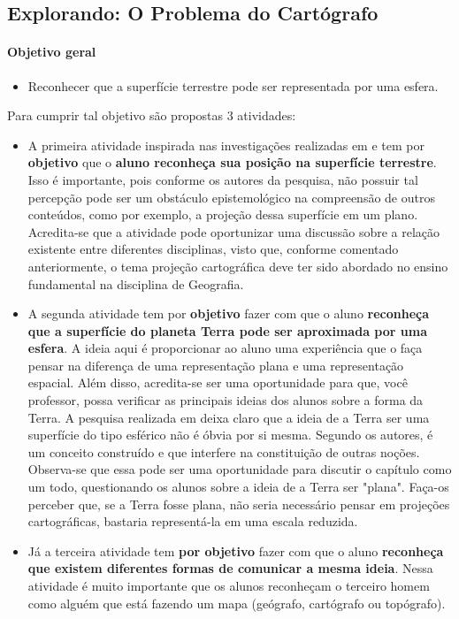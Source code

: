 \def\currentcolor{session1}
\begin{texto}
{
	\subsection{Explorando: O Problema do Cartógrafo}

	\paragraph{Objetivo geral}
	\begin{itemize}
	\item Reconhecer que a superfície terrestre pode ser representada por uma esfera.
	\end{itemize}

	Para cumprir tal objetivo são propostas 3 atividades:
	\begin{itemize}
	\item A primeira atividade inspirada nas investigações realizadas em \citep{Nussbaum} e \citep{Nardi}  tem por \textbf{objetivo} que o \textbf{aluno reconheça sua posição na superfície terrestre}. Isso é importante, pois conforme os autores da pesquisa, não possuir tal percepção pode ser um obstáculo epistemológico na compreensão de outros conteúdos, como por exemplo, a projeção dessa superfície em um plano. Acredita-se que a atividade pode oportunizar uma discussão sobre a relação existente entre diferentes disciplinas, visto que, conforme comentado anteriormente, o tema projeção cartográfica deve ter sido abordado no ensino fundamental na disciplina de Geografia.
	\item A segunda atividade tem por \textbf{objetivo} fazer com que o aluno \textbf{reconheça que a superfície do planeta Terra pode ser aproximada por uma esfera}. A ideia aqui é proporcionar ao aluno uma experiência que o faça pensar na diferença de uma representação plana e uma representação espacial. Além disso, acredita-se ser uma oportunidade para que, você professor, possa verificar as principais ideias dos alunos sobre a forma da Terra. A pesquisa realizada em \citep{Nussbaum1} deixa claro que a ideia de a Terra ser uma superfície do tipo esférico não é óbvia por si mesma. Segundo os autores, é um conceito construído e que interfere na constituição de outras noções. Observa-se que essa pode ser uma oportunidade para discutir o capítulo como um todo, questionando os alunos sobre a ideia de a Terra ser "plana". Faça-os perceber que, se a Terra fosse plana, não seria necessário pensar em projeções cartográficas, bastaria representá-la em uma escala reduzida.
	\item Já a terceira atividade tem \textbf{por objetivo} fazer com que o aluno \textbf{reconheça que existem diferentes formas de comunicar a mesma ideia}. Nessa atividade é muito importante que os alunos reconheçam o terceiro homem como alguém que está fazendo um mapa (geógrafo, cartógrafo ou topógrafo).
	\end{itemize}
}
\end{texto}
\label{cart_1}

